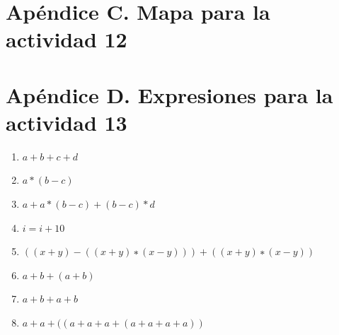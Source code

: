 \documentclass[11pt]{article}
\begin{document}
\newpage

\section{Apéndice C. Mapa para la actividad 12}

{\centering

}

\section{Apéndice D. Expresiones para la actividad 13}

\begin{enumerate}
\item $a+b+c+d$
\item $a*(b-c)$
\item $a + a * (b − c) + (b − c) * d$
\item $i = i + 10$
\item $((x + y) − ((x + y) ∗ (x − y))) + ((x + y) ∗ (x − y))$
\item $a + b + (a + b)$
\item $a + b + a + b$
\item $a + a + ((a + a + a + (a + a + a + a))$
\end{enumerate}
\newpage



\newpage
\end{document}
